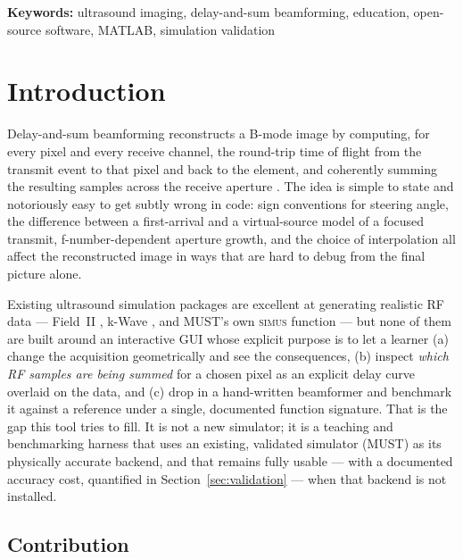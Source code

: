 \documentclass[11pt]{article}
\newcommand{\must}{MUST}
\begin{document}
\noindent\textbf{Keywords:} ultrasound imaging, delay-and-sum beamforming,
education, open-source software, MATLAB, simulation validation

\section{Introduction}

Delay-and-sum beamforming reconstructs a B-mode image by computing, for
every pixel and every receive channel, the round-trip time of flight from
the transmit event to that pixel and back to the element, and coherently
summing the resulting samples across the receive aperture
\citep{perrot2021das}. The idea is simple to state and notoriously easy to
get subtly wrong in code: sign conventions for steering angle, the
difference between a first-arrival and a virtual-source model of a focused
transmit, f-number-dependent aperture growth, and the choice of
interpolation all affect the reconstructed image in ways that are hard to
debug from the final picture alone.

Existing ultrasound simulation packages are excellent at generating
realistic RF data --- Field~II \citep{jensen1996field}, k-Wave
\citep{treeby2010kwave}, and \must{}'s own \textsc{simus} function
\citep{garcia2022simus1,cigier2022simus2} --- but none of them are built
around an interactive GUI whose explicit purpose is to let a learner (a)
change the acquisition geometrically and see the consequences, (b) inspect
\emph{which RF samples are being summed} for a chosen pixel as an explicit
delay curve overlaid on the data, and (c) drop in a hand-written beamformer
and benchmark it against a reference under a single, documented function
signature. That is the gap this tool tries to fill. It is not a new
simulator; it is a teaching and benchmarking harness that uses an existing,
validated simulator (\must) as its physically accurate backend, and that
remains fully usable --- with a documented accuracy cost, quantified in
Section~\ref{sec:validation} --- when that backend is not installed.

\subsection{Contribution}
\end{document}

